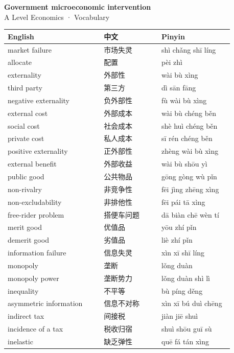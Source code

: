 \documentclass[11pt]{article}
\begin{document}
\begin{center}
  {\LARGE\bfseries Government microeconomic intervention}\\[0.35em]
  {\large A Level Economics · Vocabulary}
\end{center}
\vspace{0.6em}

\begin{longtable}{@{}p{0.40\linewidth}p{0.24\linewidth}p{0.30\linewidth}@{}}
\toprule
\textbf{English} & \textbf{中文} & \textbf{Pinyin} \\
\midrule
\endhead
\bottomrule
\endlastfoot
market failure & 市场失灵 & shì chǎng shī líng \\
allocate & 配置 & pèi zhì \\
externality & 外部性 & wài bù xìng \\
third party & 第三方 & dì sān fāng \\
negative externality & 负外部性 & fù wài bù xìng \\
external cost & 外部成本 & wài bù chéng běn \\
social cost & 社会成本 & shè huì chéng běn \\
private cost & 私人成本 & sī rén chéng běn \\
positive externality & 正外部性 & zhèng wài bù xìng \\
external benefit & 外部收益 & wài bù shōu yì \\
public good & 公共物品 & gōng gòng wù pǐn \\
non-rivalry & 非竞争性 & fēi jìng zhēng xìng \\
non-excludability & 非排他性 & fēi pái tā xìng \\
free-rider problem & 搭便车问题 & dā biàn chē wèn tí \\
merit good & 优值品 & yōu zhí pǐn \\
demerit good & 劣值品 & liè zhí pǐn \\
information failure & 信息失灵 & xìn xī shī líng \\
monopoly & 垄断 & lǒng duàn \\
monopoly power & 垄断势力 & lǒng duàn shì lì \\
inequality & 不平等 & bù píng děng \\
asymmetric information & 信息不对称 & xìn xī bú duì chēng \\
indirect tax & 间接税 & jiàn jiē shuì \\
incidence of a tax & 税收归宿 & shuì shōu guī sù \\
inelastic & 缺乏弹性 & quē fá tán xìng \\

\end{longtable}
\end{document}
